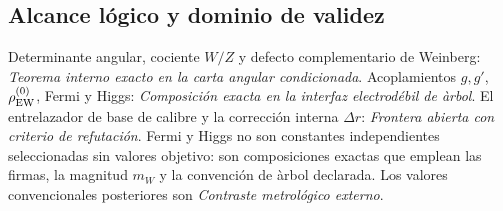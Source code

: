 \subsection*{Alcance lógico y dominio de validez}
Determinante angular, cociente \(W/Z\) y defecto complementario de Weinberg:
\emph{Teorema interno exacto en la carta angular condicionada}. Acoplamientos \(g,g'\),
\(\rho_{\rm EW}^{(0)}\), Fermi y Higgs: \emph{Composici\'on exacta en la
interfaz electrod\'ebil de \`arbol}. El entrelazador de base de calibre y la
correcci\'on interna \(\Delta r\): \emph{Frontera abierta con criterio de refutación}.
Fermi y Higgs no son constantes independientes seleccionadas sin valores
objetivo: son composiciones exactas que emplean las firmas, la magnitud
\(m_W\) y la
convenci\'on de \`arbol declarada. Los valores convencionales posteriores
son \emph{Contraste metrol\'ogico externo}.

